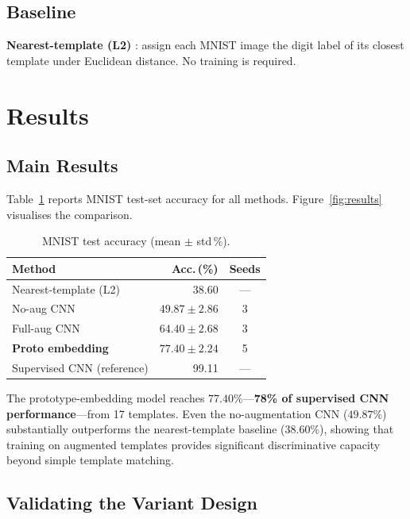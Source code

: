 \documentclass[final,5p,times,twocolumn]{elsarticle}
\begin{document}
\subsection{Baseline}

\textbf{Nearest-template (L2)} \cite{Cover1967}: assign each MNIST image the digit label
of its closest template under Euclidean distance.
No training is required.

\section{Results}

\subsection{Main Results}

Table~\ref{tab:main} reports MNIST test-set accuracy for all methods.
Figure~\ref{fig:results} visualises the comparison.

\begin{table}[t]
  \caption{MNIST test accuracy (mean $\pm$ std\,\%).}
  \label{tab:main}
  \centering
  \begin{tabular}{@{}lrc@{}}
    \toprule
    Method & Acc.\,(\%) & Seeds \\
    \midrule
    Nearest-template (L2)      & 38.60         & --- \\
    No-aug CNN                 & $49.87 \pm 2.86$ & 3 \\
    Full-aug CNN               & $64.40 \pm 2.68$ & 3 \\
    \textbf{Proto embedding}   & $\mathbf{77.40 \pm 2.24}$ & 5 \\
    \midrule
    Supervised CNN (reference) & 99.11         & --- \\
    \bottomrule
  \end{tabular}
\end{table}

The prototype-embedding model reaches $77.40\%$—\textbf{78\% of supervised CNN
performance}—from 17 templates.
Even the no-augmentation CNN ($49.87\%$) substantially outperforms the nearest-template
baseline ($38.60\%$), showing that training on augmented templates provides significant
discriminative capacity beyond simple template matching.

\subsection{Validating the Variant Design}
\label{sec:variant-validation}
\end{document}
